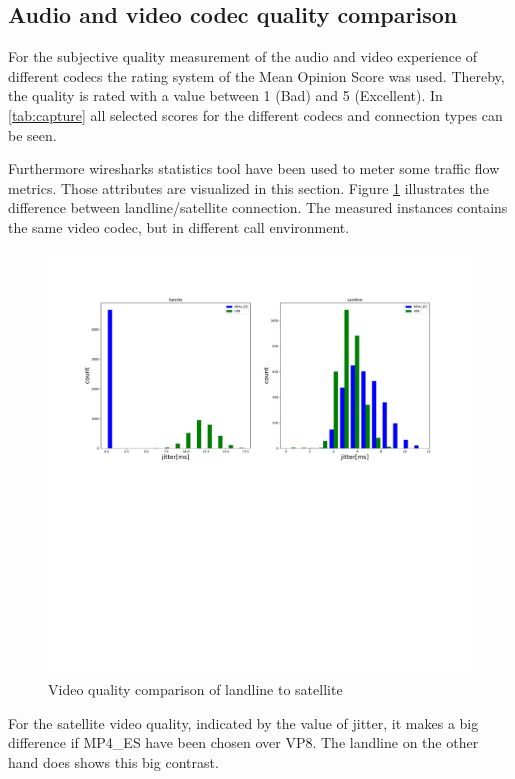 \documentclass[parskip=full]{scrartcl}
\begin{document}
\subsection{Audio and video codec quality comparison} \label{subsec:audio}
For the subjective quality measurement of the audio and video experience of different codecs the rating system of the Mean Opinion Score was used.
Thereby, the quality is rated with a value between 1 (Bad) and 5 (Excellent). 
In \cref{tab:capture} all selected scores for the different codecs and connection types can be seen.

Furthermore wiresharks statistics tool have been used to meter some traffic flow metrics. Those attributes are visualized in this section. Figure \ref{fig:comparison} illustrates the difference between landline/satellite connection. The measured instances contains the same video codec, but in different call environment. 

\begin{figure}[!ht]
	\centering %
	\includegraphics[width=\textwidth]{images/comparison.pdf} %
	\caption{Video quality comparison of landline to satellite} 
	\label{fig:comparison} %
\end{figure} 

For the satellite video quality, indicated by the value of jitter, it makes a big difference if MP4\_ES have been chosen over VP8. The landline on the other hand does shows this big contrast.
\end{document}
